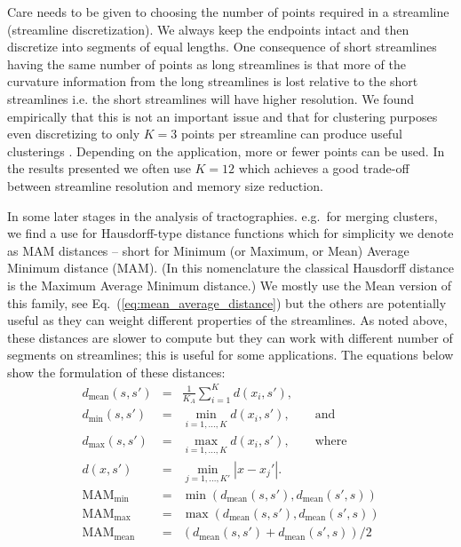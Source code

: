 \documentclass{bioinfo}
\begin{document}
\begin{methods}
Care needs to be given to choosing the number of points required in a
streamline (streamline discretization). We always keep the endpoints
intact and then discretize into segments of equal lengths. One
consequence of short streamlines having the same number of points as
long streamlines is that more of the curvature information from the long
streamlines is lost relative to the short streamlines i.e. the short
streamlines will have higher resolution.  We found empirically that this
is not an important issue and that for clustering purposes even
discretizing to only $K=3$ points per streamline can produce useful
clusterings \citep{EGMB10}. Depending on the application, more or fewer
points can be used. In the results presented we often use $K=12$ which
achieves a good trade-off between streamline resolution and memory size
reduction.

In some later stages in the analysis of tractographies. e.g.~for merging
clusters, we find a use for Hausdorff-type distance functions which for
simplicity we denote as MAM distances -- short for Minimum (or Maximum,
or Mean) Average Minimum distance (MAM). (In this nomenclature the
classical Hausdorff distance is the Maximum Average Minimum distance.)
We mostly use the Mean version of this family, see
Eq.~(\ref{eq:mean_average_distance}) but the others are potentially
useful as they can weight different properties of the streamlines. As
noted above, these distances are slower to compute but they can work
with different number of segments on streamlines; this is useful for
some applications. The equations below show the formulation of these
distances:
\begin{eqnarray}
d_{\textrm{mean}}(s,s') & = & \frac{1}{K_{A}}\sum_{i=1}^{K}d(x_{i},s'),\nonumber \\
d_{\textrm{min}}(s,s') & = & \min_{i=1,...,K}d(x_{i},s'),\qquad\textrm{and}\label{eq:minimum_distance}\\
d_{\textrm{max}}(s,s') & = & \max_{i=1,...,K }d(x_{i},s'),\qquad\textrm{where}\label{eq:maximum distance}\\
d(x,s') & = & \min_{j=1,...,K'}|x-x_{j}'|.\nonumber \\
\textrm{MAM}_{\textrm{min}} & = & \min(d_{\textrm{mean}}(s,s'),d_{\textrm{mean}}(s',s))\label{eq:min_average_distance}\\
\textrm{MAM}_{\textrm{max}} & = & \max(d_{\textrm{mean}}(s,s'),d_{\textrm{mean}}(s',s))\nonumber \\
\textrm{MAM}_{\textrm{mean}} & = & (d_{\textrm{mean}}(s,s')+d_{\textrm{mean}}(s',s))/2\label{eq:mean_average_distance}\end{eqnarray}



\end{methods}
\end{document}

